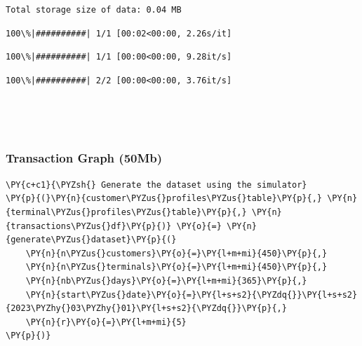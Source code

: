     \begin{Verbatim}[commandchars=\\\{\}]
Total storage size of data: 0.04 MB
    \end{Verbatim}

    
    \begin{Verbatim}[commandchars=\\\{\}]
  100\%|##########| 1/1 [00:02<00:00, 2.26s/it]
    \end{Verbatim}

    
    
    \begin{Verbatim}[commandchars=\\\{\}]
  100\%|##########| 1/1 [00:00<00:00, 9.28it/s]
    \end{Verbatim}

    
    
    \begin{Verbatim}[commandchars=\\\{\}]
  100\%|##########| 2/2 [00:00<00:00, 3.76it/s]
    \end{Verbatim}

    
    \begin{center}
    \end{center}
    { \hspace*{\fill} \\}
    
    \begin{center}
    \end{center}
    { \hspace*{\fill} \\}
    
    \hypertarget{transaction-graph-50mb}{%
\subsubsection{Transaction Graph (50Mb)}\label{transaction-graph-50mb}}

    \begin{tcolorbox}[breakable, size=fbox, boxrule=1pt, pad at break*=1mm,colback=cellbackground, colframe=cellborder]
\begin{Verbatim}[commandchars=\\\{\}]
\PY{c+c1}{\PYZsh{} Generate the dataset using the simulator}
\PY{p}{(}\PY{n}{customer\PYZus{}profiles\PYZus{}table}\PY{p}{,} \PY{n}{terminal\PYZus{}profiles\PYZus{}table}\PY{p}{,} \PY{n}{transactions\PYZus{}df}\PY{p}{)} \PY{o}{=} \PY{n}{generate\PYZus{}dataset}\PY{p}{(}
    \PY{n}{n\PYZus{}customers}\PY{o}{=}\PY{l+m+mi}{450}\PY{p}{,}
    \PY{n}{n\PYZus{}terminals}\PY{o}{=}\PY{l+m+mi}{450}\PY{p}{,}
    \PY{n}{nb\PYZus{}days}\PY{o}{=}\PY{l+m+mi}{365}\PY{p}{,}
    \PY{n}{start\PYZus{}date}\PY{o}{=}\PY{l+s+s2}{\PYZdq{}}\PY{l+s+s2}{2023\PYZhy{}03\PYZhy{}01}\PY{l+s+s2}{\PYZdq{}}\PY{p}{,}
    \PY{n}{r}\PY{o}{=}\PY{l+m+mi}{5}
\PY{p}{)}
\end{Verbatim}
\end{tcolorbox}

